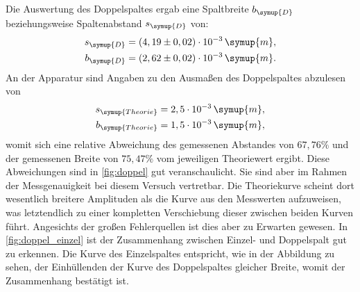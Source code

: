 Die Auswertung des Doppelspaltes ergab eine Spaltbreite $b_{\symup{D}}$ beziehungsweise Spaltenabstand $s_{\symup{D}}$ von:
\begin{align*}
    s_{\symup{D}} = (4,19 \pm 0,02) \cdot 10^{-3} \,  \symup{m}, \\
    b_{\symup{D}} = (2,62 \pm 0,02) \cdot 10^{-3} \, \symup{m}.
\end{align*}
An der Apparatur sind Angaben zu den Ausmaßen des Doppelspaltes abzulesen von
 \begin{align*}
        s_{\symup{Theorie}} = 2,5 \cdot 10^{-3} \, \symup{m}, \\
        b_{\symup{Theorie}} = 1,5 \cdot 10^{-3} \, \symup{m},
 \end{align*}
womit sich eine relative Abweichung des gemessenen Abstandes von $67,76 \%$ und der gemessenen Breite von $75,47\%$ vom jeweiligen Theoriewert
ergibt. Diese Abweichungen sind in \autoref{fig:doppel} gut veranschaulicht. Sie sind aber im Rahmen der Messgenauigkeit bei diesem Versuch
vertretbar. Die Theoriekurve scheint dort wesentlich breitere
Amplituden als die Kurve aus den Messwerten aufzuweisen, was letztendlich zu einer kompletten Verschiebung dieser zwischen beiden Kurven führt.
Angesichts der großen Fehlerquellen ist dies aber zu Erwarten gewesen. In \autoref{fig:doppel_einzel} ist der Zusammenhang zwischen Einzel- und 
Doppelspalt gut zu erkennen. Die Kurve des Einzelspaltes entspricht, wie in der Abbildung zu sehen, der Einhüllenden der Kurve des Doppelspaltes 
gleicher Breite, womit der Zusammenhang bestätigt ist.